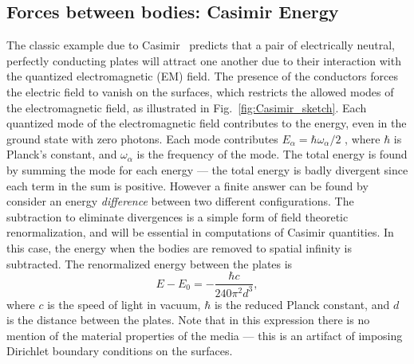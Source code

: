 
\subsection{Forces between bodies: Casimir Energy}

The classic example due to Casimir~\cite{Casimir1948} predicts that a pair of electrically neutral,
perfectly conducting plates will attract one another due to their interaction with the quantized 
electromagnetic (EM) field.  
The presence of the conductors forces the electric field to vanish on the surfaces,
which restricts the allowed modes of the electromagnetic field, as illustrated in Fig.~\ref{fig:Casimir_sketch}.
Each quantized mode of the electromagnetic field contributes
to the energy, even in the ground state with zero photons.  Each mode contributes 
$E_\alpha=\hbar\omega_\alpha/2$ , where $\hbar$ is Planck's  constant, and $\omega_\alpha$ is the frequency of the mode.
The total energy is found by summing the mode for each energy --- the total energy is
badly divergent since each term in the sum is positive.  However a finite answer can 
be found by consider an energy \emph{difference} between two different configurations.  
The subtraction to eliminate divergences is a simple form of field theoretic renormalization, 
and will be essential in computations of Casimir quantities.  
In this case, the energy when the bodies are removed to spatial infinity is subtracted.  
The renormalized energy between the plates is
\begin{equation}
  E-E_0 = -\frac{\hbar c}{240\pi^2 d^3},
\end{equation}
where $c$ is the speed of light in vacuum, $\hbar$ is the reduced Planck constant,
and $d$ is the distance between the plates.  Note that in this expression there is no
mention of the material properties of the media --- this is an artifact of imposing Dirichlet
boundary conditions on the surfaces.  

